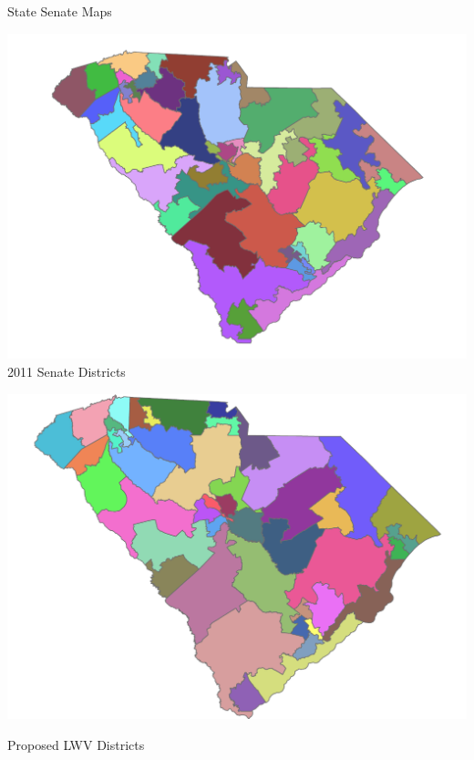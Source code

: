 \documentclass[xcolor=dvipsnames,table]{beamer}
\theoremstyle{plain}
\theoremstyle{definition}
\begin{document}
\begin{frame}{State Senate Maps}
\begin{minipage}{0.5\textwidth}
\hspace{-13mm}\includegraphics[scale=0.43]{Senate2011.pdf}
\hspace{25mm}2011 Senate Districts
\end{minipage}%
\begin{minipage}{0.5\textwidth}
\hspace{-5mm}\includegraphics[scale=0.38]{Senate2021.pdf}

\vspace{3mm}

\hspace{10mm} Proposed LWV Districts
\end{minipage}
\end{frame}
\end{document}
